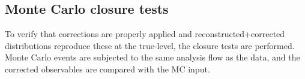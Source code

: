 % 
% 
% 
% 

\subsection{Monte Carlo closure tests}\label{subsec:mcClosure}

To verify that corrections are properly applied and reconstructed+corrected distributions reproduce these at the true-level, the closure tests are performed. Monte Carlo events are subjected to the same analysis flow as the data, and the corrected observables are compared with the MC input.

